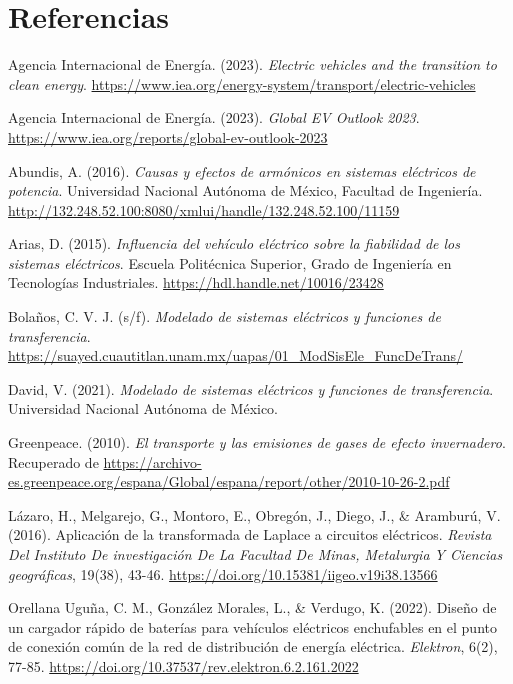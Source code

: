 \section{Referencias}
\renewcommand{\refname}{}  %
\begin{thebibliography}{9}

	Agencia Internacional de Energía. (2023). \textit{Electric vehicles and the transition to clean energy}. \url{https://www.iea.org/energy-system/transport/electric-vehicles}

	Agencia Internacional de Energía. (2023). \textit{Global EV Outlook 2023}. \url{https://www.iea.org/reports/global-ev-outlook-2023}

	Abundis, A. (2016). \textit{Causas y efectos de armónicos en sistemas eléctricos de potencia}. Universidad Nacional Autónoma de México, Facultad de Ingeniería. \url{http://132.248.52.100:8080/xmlui/handle/132.248.52.100/11159}

	Arias, D. (2015). \textit{Influencia del vehículo eléctrico sobre la fiabilidad de los sistemas eléctricos}. Escuela Politécnica Superior, Grado de Ingeniería en Tecnologías Industriales. \url{https://hdl.handle.net/10016/23428}

	Bolaños, C. V. J. (s/f). \textit{Modelado de sistemas eléctricos y funciones de transferencia}. \url{https://suayed.cuautitlan.unam.mx/uapas/01_ModSisEle_FuncDeTrans/}

	David, V. (2021). \textit{Modelado de sistemas eléctricos y funciones de transferencia}. Universidad Nacional Autónoma de México.

	Greenpeace. (2010). \textit{El transporte y las emisiones de gases de efecto invernadero}. Recuperado de \url{https://archivo-es.greenpeace.org/espana/Global/espana/report/other/2010-10-26-2.pdf}

	Lázaro, H., Melgarejo, G., Montoro, E., Obregón, J., Diego, J., \& Aramburú, V. (2016). Aplicación de la transformada de Laplace a circuitos eléctricos. \textit{Revista Del Instituto De investigación De La Facultad De Minas, Metalurgia Y Ciencias geográficas}, 19(38), 43-46. \url{https://doi.org/10.15381/iigeo.v19i38.13566}

	Orellana Uguña, C. M., González Morales, L., \& Verdugo, K. (2022). Diseño de un cargador rápido de baterías para vehículos eléctricos enchufables en el punto de conexión común de la red de distribución de energía eléctrica. \textit{Elektron}, 6(2), 77-85. \url{https://doi.org/10.37537/rev.elektron.6.2.161.2022}


\end{thebibliography}
